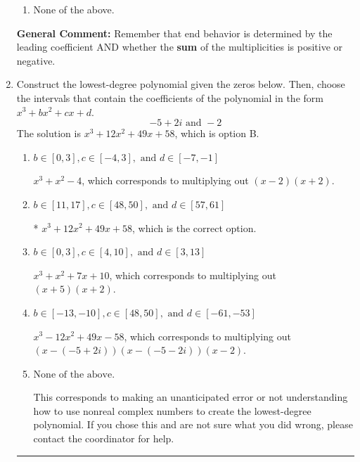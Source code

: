 \documentclass{extbook}[14pt]
\newcommand{\litem}[1]{\item #1

\rule{\textwidth}{0.4pt}}
\begin{document}
\begin{enumerate}
{\begin{enumerate}[label=\Alph*.]
\item None of the above.\end{enumerate}
\textbf{General Comment:} Remember that end behavior is determined by the leading coefficient AND whether the \textbf{sum} of the multiplicities is positive or negative.
}
\litem{
Construct the lowest-degree polynomial given the zeros below. Then, choose the intervals that contain the coefficients of the polynomial in the form $x^3+bx^2+cx+d$.
\[ -5 + 2 i \text{ and } -2 \]
The solution is \( x^{3} +12 x^{2} +49 x + 58 \), which is option B.\begin{enumerate}[label=\Alph*.]
\item \( b \in [0, 3], c \in [-4, 3], \text{ and } d \in [-7, -1] \)

$x^{3} + x^{2} -4$, which corresponds to multiplying out $(x -2)(x + 2)$.
\item \( b \in [11, 17], c \in [48, 50], \text{ and } d \in [57, 61] \)

* $x^{3} +12 x^{2} +49 x + 58$, which is the correct option.
\item \( b \in [0, 3], c \in [4, 10], \text{ and } d \in [3, 13] \)

$x^{3} + x^{2} +7 x + 10$, which corresponds to multiplying out $(x + 5)(x + 2)$.
\item \( b \in [-13, -10], c \in [48, 50], \text{ and } d \in [-61, -53] \)

$x^{3} -12 x^{2} +49 x -58$, which corresponds to multiplying out $(x-(-5 + 2 i))(x-(-5 - 2 i))(x -2)$.
\item \( \text{None of the above.} \)

This corresponds to making an unanticipated error or not understanding how to use nonreal complex numbers to create the lowest-degree polynomial. If you chose this and are not sure what you did wrong, please contact the coordinator for help.
\end{enumerate}

}
\end{enumerate}
\end{document}
